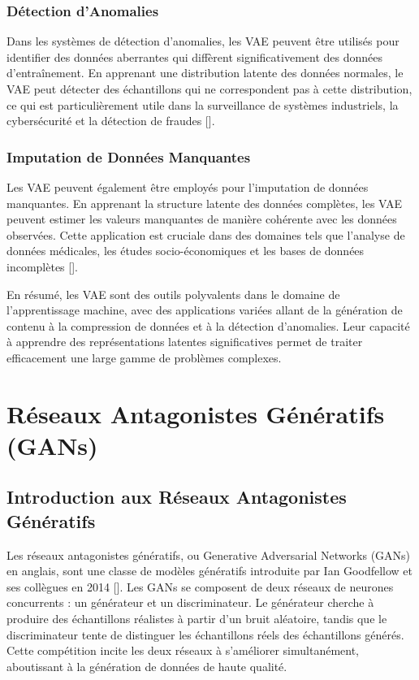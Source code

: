 \subsubsection{Détection d'Anomalies}

Dans les systèmes de détection d'anomalies, les VAE peuvent être utilisés pour
identifier des données aberrantes qui diffèrent significativement des données
d'entraînement. En apprenant une distribution latente des données normales, le
VAE peut détecter des échantillons qui ne correspondent pas à cette
distribution, ce qui est particulièrement utile dans la surveillance de
systèmes industriels, la cybersécurité et la détection de fraudes [\cite{wang2019revisiting}].

\subsubsection{Imputation de Données Manquantes}

Les VAE peuvent également être employés pour l'imputation de données
manquantes. En apprenant la structure latente des données complètes, les VAE
peuvent estimer les valeurs manquantes de manière cohérente avec les données
observées. Cette application est cruciale dans des domaines tels que l'analyse
de données médicales, les études socio-économiques et les bases de données
incomplètes [\cite{collier2020vaes}].

En résumé, les VAE sont des outils polyvalents dans le domaine de
l'apprentissage machine, avec des applications variées allant de la génération
de contenu à la compression de données et à la détection d'anomalies. Leur
capacité à apprendre des représentations latentes significatives permet de
traiter efficacement une large gamme de problèmes complexes.

\section{Réseaux Antagonistes Génératifs (GANs)}

\subsection{Introduction aux Réseaux Antagonistes Génératifs}

Les réseaux antagonistes génératifs, ou Generative Adversarial Networks (GANs)
en anglais, sont une classe de modèles génératifs introduite par Ian Goodfellow
et ses collègues en 2014 [\cite{goodfellow2014generative}]. Les GANs se
composent de deux réseaux de neurones concurrents : un générateur et un
discriminateur. Le générateur cherche à produire des échantillons réalistes à
partir d'un bruit aléatoire, tandis que le discriminateur tente de distinguer
les échantillons réels des échantillons générés. Cette compétition incite les
deux réseaux à s'améliorer simultanément, aboutissant à la génération de
données de haute qualité.

